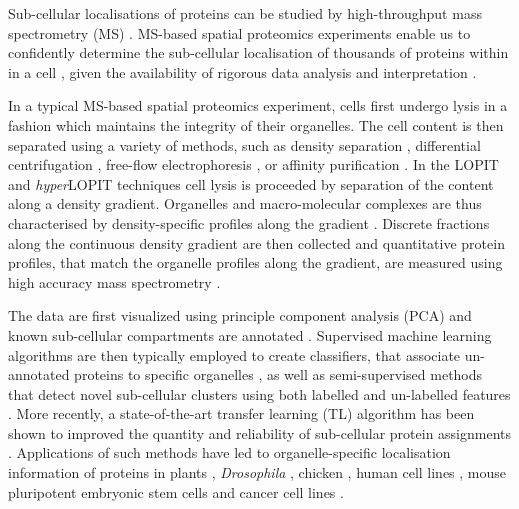 \documentclass[12pt,english]{article}
\begin{document}
Sub-cellular localisations of proteins
can be studied by high-throughput mass spectrometry (MS)
\citep{Gatto:2010}. MS-based spatial proteomics experiments enable us
to confidently determine the sub-cellular localisation of thousands of
proteins within in a cell \citep{hyper}, given the availability of
rigorous data analysis and interpretation \citep{Gatto:2010}.

In a typical MS-based spatial proteomics experiment, cells first
undergo lysis in a fashion which maintains the integrity of their
organelles. The cell content is then separated using a variety of
methods, such as density separation \citep{Dunkley:2006,hyper},
differential centrifugation \citep{Itzhak:2016}, free-flow electrophoresis
\citep{Parsons:2014}, or affinity purification \citep{Heard:2015}. In the LOPIT
\citep{Dunkley:2004, Dunkley:2006, Sadowski:2006} and \textit{hyper}LOPIT \citep{Mulvey:2017} techniques
cell lysis is proceeded by separation of
the content along a density gradient. Organelles
and macro-molecular complexes are thus characterised by
density-specific profiles along the gradient \citep{DeDuve:1981}.
Discrete fractions along the continuous density gradient are then collected and
quantitative protein profiles, that match the organelle profiles along
the gradient, are measured using high accuracy mass spectrometry
\citep{Mulvey:2017}.

The data are first visualized using principle component
analysis (PCA) and known sub-cellular compartments are annotated
\citep{ghrepo}. Supervised machine learning algorithms are then typically
employed to create classifiers, that associate un-annotated
proteins to specific organelles \citep{Gatto:2014b}, as well
as semi-supervised methods that detect novel sub-cellular
clusters using both labelled and un-labelled features
\citep{Breckels:2013}. More recently, a state-of-the-art
transfer learning (TL) algorithm has been shown to improved
the quantity and reliability of sub-cellular protein
assignments \citep{Breckels:2016}. Applications of such
methods have led to organelle-specific localisation
information of proteins in plants \citep{Dunkley:2006}, \textit{Drosophila}
\citep{Tan:2009}, chicken \citep{hall:2009}, human cell lines
\citep{Breckels:2013}, mouse pluripotent embryonic stem cells
\citep{hyper} and cancer cell lines \citep{Thul:2017}.
\end{document}

